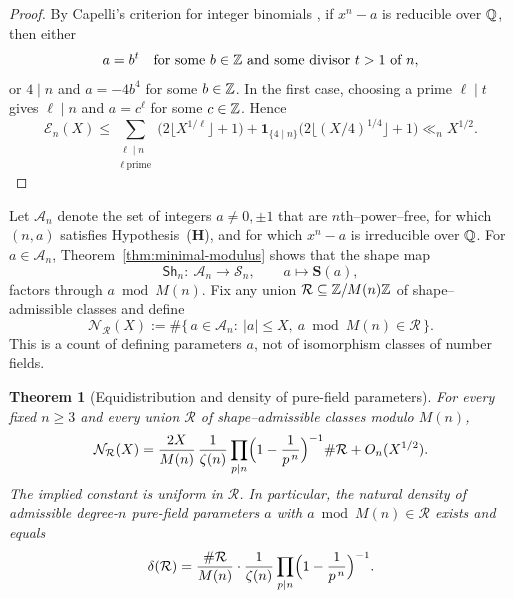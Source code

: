 \documentclass[12pt,a4paper,oneside]{amsart}
\newtheorem{theorem}{Theorem}[section]
\theoremstyle{definition}
\begin{document}
\begin{proof}
By Capelli's criterion for integer binomials \cite{KoleyReddy20}, if $x^n-a$ is reducible over $\Bbb Q$, then either
\[
a=b^t\quad\text{for some }b\in\Bbb Z\text{ and some divisor }t>1\text{ of }n,
\]
or $4\mid n$ and $a=-4b^4$ for some $b\in\Bbb Z$. In the first case, choosing a prime $\ell\mid t$ gives $\ell\mid n$ and $a=c^\ell$ for some $c\in\Bbb Z$. Hence
\[
\mathcal E_n(X)
\le
\sum_{\substack{\ell\mid n\\ \ell\ \text{prime}}}
\bigl(2\lfloor X^{1/\ell}\rfloor+1\bigr)
+
\mathbf 1_{\{4\mid n\}}\bigl(2\lfloor (X/4)^{1/4}\rfloor+1\bigr)
\ll_n X^{1/2}.
\]
\end{proof}

Let $\mathcal A_n$ denote the set of integers $a\neq0,\pm1$ that are $n$th--power--free, for which $(n,a)$ satisfies Hypothesis~\textup{(\textbf{H})}, and for which $x^n-a$ is irreducible over $\Bbb Q$. For $a\in\mathcal A_n$, Theorem~\ref{thm:minimal-modulus} shows that the shape map
\[
\mathsf{Sh}_n:\ \mathcal A_n\longrightarrow\mathcal S_n,
\qquad a\longmapsto\mathbf S(a),
\]
factors through $a\bmod M(n)$. Fix any union
$\mathcal R\subseteq\Bbb Z/M(n)\Bbb Z$ of shape--admissible classes and define
\[
\mathcal N_\mathcal R(X)
:=
\#\bigl\{\,a\in\mathcal A_n:\ |a|\le X,\ a\bmod M(n)\in\mathcal R\,\bigr\}.
\]
This is a count of defining parameters $a$, not of isomorphism classes of number fields.

\begin{theorem}[Equidistribution and density of pure-field parameters]\label{thm:shape-density}
For every fixed $n\ge3$ and every union $\mathcal R$ of shape--admissible classes modulo $M(n)$,
\[
\mathcal N_\mathcal R(X)
=
\frac{2X}{M(n)}\,
\frac{1}{\zeta(n)}
\prod_{p\mid n}\Bigl(1-\frac1{p^{\,n}}\Bigr)^{-1}
\#\mathcal R
+O_n(X^{1/2}).
\]
The implied constant is uniform in $\mathcal R$. In particular, the natural density of admissible degree-$n$ pure-field parameters $a$ with $a\bmod M(n)\in\mathcal R$ exists and equals
\[
\delta(\mathcal R)
=
\frac{\#\mathcal R}{M(n)}\cdot
\frac{1}{\zeta(n)}
\prod_{p\mid n}\Bigl(1-\frac1{p^{\,n}}\Bigr)^{-1}.
\]
\end{theorem}
\end{document}
